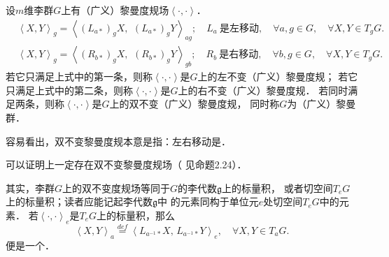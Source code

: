 \begin{definition}
    设$m$维李群$G$上有（广义）黎曼度规场$\left<\cdot,\cdot \right>$．
    \begin{align*}
        &\left<X,Y\right>_{g} = \left<(L_{a*})_g X,\,\ (L_{a*})_g Y \right>_{ag};
        \quad L_{a} \  \text{是左移动},\quad \forall a,g\in G, \quad \forall X,Y \in T_g G. \\
        &\left<X,Y\right>_{g} = \left<(R_{b*})_g X,\,\ (R_{b*})_g Y \right>_{gb};
        \quad R_{b} \  \text{是右移动} ,\quad \forall b,g\in G, \quad \forall X,Y \in T_g G. 
    \end{align*}
    若它只满足上式中的第一条，则称$\left<\cdot,\cdot \right>$是$G$上的{\heiti 左不变（广义）黎曼度规}；
    若它只满足上式中的第二条，则称$\left<\cdot,\cdot \right>$是$G$上的{\heiti 右不变（广义）黎曼度规}．
    若同时满足两条，则称$\left<\cdot,\cdot \right>$是$G$上的{\heiti 双不变（广义）黎曼度规}，
    同时称$G$为{\heiti （广义）黎曼群}．
\end{definition}
容易看出，双不变黎曼度规本意是指：左右移动是．


可以证明上一定存在双不变黎曼度规场（ 见\parencite[\S 2.2]{Alexandrino-2015}命题2.24）．

其实，李群$G$上的双不变度规场等同于$G$的李代数$\mathfrak{g}$上的标量积，
或者切空间$T_e G$上的标量积；读者应能记起李代数$\mathfrak{g}$中
的元素同构于单位元$e$处切空间$T_e G$中的元素．
若$\left<\cdot,\cdot \right>_e$是$T_e G$上的标量积，那么
\begin{equation}
    \left<X,Y\right>_a \overset{def}{=} 
    \left<L_{a^{-1}*} X,\, L_{a^{-1}*} Y \right>_e, 
    \quad \forall X,Y \in T_a G.
\end{equation}
便是一个．




